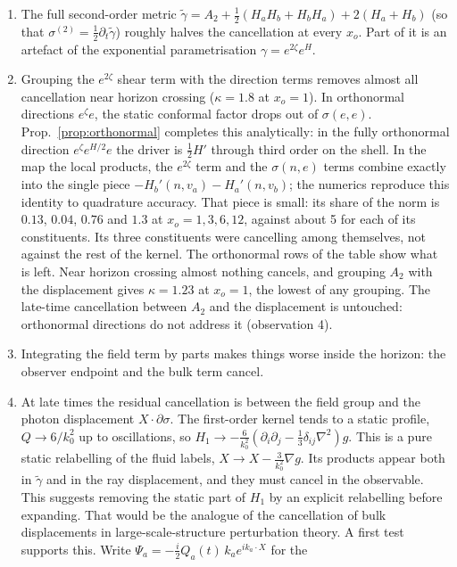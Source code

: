 \begin{enumerate}
\item The full second-order metric
  $\tilde\gamma=A_2+\frac12(H_aH_b+H_bH_a)+2(H_a+H_b)$ (so that $\sigma^{(2)}=\frac12\partial_t\tilde\gamma$)
  roughly halves the cancellation at every $x_o$. Part of it is an artefact of the
  exponential parametrisation $\gamma=e^{2\zeta}e^H$.
\item Grouping the $e^{2\zeta}$ shear term with the direction terms removes almost all
  cancellation near horizon crossing ($\kappa=1.8$ at $x_o=1$). In orthonormal directions
  $e^{\zeta}e$, the static conformal factor drops out of $\sigma(e,e)$. Prop.~\ref{prop:orthonormal} completes
  this analytically: in the fully orthonormal direction $e^{\zeta}e^{H/2}e$ the driver is
  $\frac12H'$ through third order on the shell. In the map the local products, the
  $e^{2\zeta}$ term and the $\sigma(n,e)$ terms combine exactly into the single piece
  $-H_b'(n,v_a)-H_a'(n,v_b)$; the numerics reproduce this identity to quadrature accuracy.
  That piece is small: its share of the norm is $0.13$, $0.04$, $0.76$ and $1.3$ at
  $x_o=1,3,6,12$, against about 5 for each of its constituents. Its three constituents were
  cancelling among themselves, not against the rest of the kernel. The orthonormal rows of the
  table show what is left. Near horizon crossing almost nothing cancels, and grouping $A_2$
  with the displacement gives $\kappa=1.23$ at $x_o=1$, the lowest of any grouping. The
  late-time cancellation between $A_2$ and the displacement is untouched: orthonormal
  directions do not address it (observation 4).
\item Integrating the field term by parts makes things worse inside the horizon: the observer
  endpoint and the bulk term cancel.
\item At late times the residual cancellation is between the field group and the photon
  displacement $X\cdot\partial\sigma$. The first-order kernel tends to a static profile,
  $Q\to6/k_0^2$ up to oscillations, so $H_1\to-\frac6{k_0^2}(\partial_i\partial_j-\frac13\delta_{ij}\nabla^2)g$.
  This is a pure static relabelling of the fluid labels, $X\to X-\frac3{k_0^2}\nabla g$. Its
  products appear both in $\tilde\gamma$ and in the ray displacement, and they must cancel in
  the observable. This suggests removing the static part of $H_1$ by an explicit
  relabelling before expanding. That would be the analogue of the cancellation of bulk
  displacements in large-scale-structure perturbation theory.
  A first test supports this. Write $\Psi_a=-\frac i2Q_a(t)\,k_ae^{ik_a\cdot X}$ for the

\end{enumerate}
